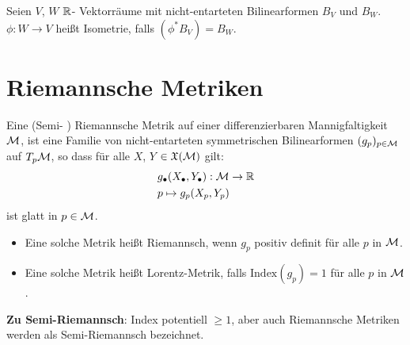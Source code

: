 \begin{defs}[Isometrie]
Seien $V$, $W$ $\mathbb{R}$- Vektorräume mit nicht-entarteten Bilinearformen $B_V$ und $B_W$.
$\phi: W \to V$ heißt Isometrie, falls $(\phi^\ast B_V) = B_W$.
\end{defs}

\section{Riemannsche Metriken}

\begin{defs}
Eine (Semi- ) Riemannsche Metrik auf einer differenzierbaren Mannigfaltigkeit $\mathcal{M}$, ist eine Familie von nicht-entarteten symmetrischen Bilinearformen 
$(g_p)_{p \in \mathcal{M}}$ auf $T_p \mathcal{M}$, so dass für alle $X$, $Y$ $\in \mathfrak{X}(\mathcal{M})$ gilt:
\begin{align}
&g_{\bullet} (X_\bullet, Y_\bullet): \mathcal{M} \to \mathbb{R} \\
& p \mapsto g_p (X_p, Y_p)
\end{align}
ist glatt in $p \in \mathcal{M}$.
\end{defs}


\begin{bem}\leavevmode
\begin{itemize}
\item Eine solche Metrik heißt Riemannsch, wenn $g_p$ positiv definit für alle $p$ in $\mathcal{M}$.
\item Eine solche Metrik heißt Lorentz-Metrik, falls $\mathrm{Index} (g_p) = 1$ für alle $p$ in $\mathcal{M}$.
\end{itemize}
\end{bem}

\textbf{Zu Semi-Riemannsch}:
Index potentiell $\geq 1$, aber auch Riemannsche Metriken werden als Semi-Riemannsch bezeichnet.



